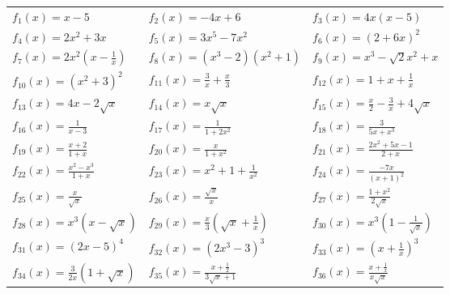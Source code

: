 \documentclass[oneside,12pt]{book}          %
\begin{document}
\renewcommand{\arraystretch}{1.8}
\begin{tabular}{p{} p{} p{}}

    $f_{1}(x)=x-5$ &
    $f_{2}(x)=-4x+6 $ &
    $f_{3}(x)=4x(x-5) $ \\
    $f_{4}(x)=2x^{2}+3x$  &
    $f_{5}(x)=3x^{5}-7x^{2} $  &
    $f_{6}(x)=(2+6x)^{2} $ \\ 
    $f_{7}(x)=2x^{2}\left(x-\frac{1}{x}\right) $ &
    $f_{8}(x)=(x^{3}-2)(x^2+1) $ &
    $f_{9}(x)=x^{3}-\sqrt{2}x^{2}+x $\\
    $f_{10}(x)=\left(x^2+3\right)^2$ & 

    $f_{11}(x)=\frac{3}{x} + \frac{x}{3}$ &
    $f_{12}(x)= 1+x+\frac{1}{x} $ \\ 
    $f_{13}(x)=4x-2\sqrt{x} $ &    
    $f_{14}(x)=x\sqrt{x} $ &
    $f_{15}(x)=\frac{x}{2}-\frac{3}{x}+4\sqrt{x}$ \\

    $f_{16}(x)=\frac{1}{x-3} $ &
    $f_{17}(x)=\frac{1}{1+2x^{2}} $ &
    $f_{18}(x)=\frac{3}{5x+x^{3}} $ \\

    $f_{19}(x)=\frac{x+2}{1+x} $ &
    $f_{20}(x)=\frac{x}{1+x^{2}} $ &
    $f_{21}(x)=\frac{2x^{2}+5x-1}{2+x} $ \\
    $f_{22}(x)=\frac{x^2-x^3}{1+x}$ &
    $f_{23}(x)=x^2+1+\frac{1}{x^2}$ &
    $f_{24}(x)=\frac{-7x}{(x+1)^2}$ \\
	$f_{25}(x)=\frac{x}{\sqrt{x}} $ &
    $f_{26}(x)=\frac{\sqrt{x}}{x} $ &
    $f_{27}(x)=\frac{1+x^2}{2\sqrt{x}}$ \\

    $f_{28}(x)=x^{3}(x-\sqrt{x}) $ &
    $f_{29}(x)=\frac{x}{3}\left(\sqrt{x}+\frac{1}{x}\right)$ &
    $f_{30}(x)=x^3\left(1-\frac{1}{\sqrt{x}}\right)$ \\

    $f_{31}(x)=(2x-5)^4$ &
    $f_{32}(x)=\left(2x^3-3\right)^3$ &
    $f_{33}(x)=\left(x+\frac{1}{x}\right)^3$ \\

    $f_{34}(x)=\frac{3}{2x}(1+\sqrt{x}) $ &
    $f_{35}(x)=\frac{x+\frac{1}{2}}{3\sqrt{x}+1} $ &
    $f_{36}(x)=\frac{x+\frac{1}{x}}{x\sqrt{x}}$
\end{tabular}
\end{document}
